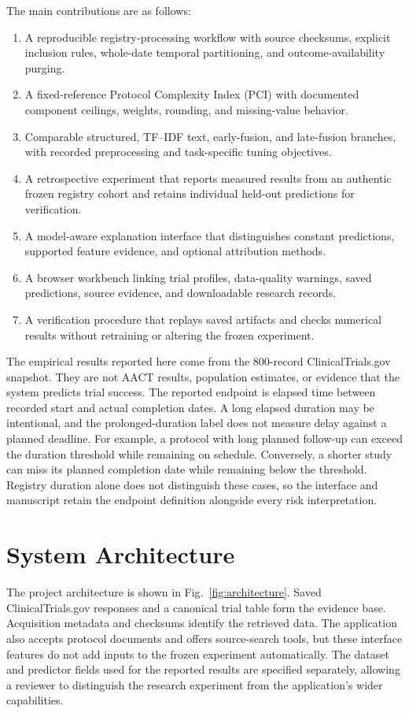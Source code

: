 \documentclass[10pt,letterpaper,twocolumn]{article}
\begin{document}
The main contributions are as follows:
\begin{enumerate}
\item A reproducible registry-processing workflow with source checksums, explicit inclusion rules, whole-date temporal partitioning, and outcome-availability purging.
\item A fixed-reference Protocol Complexity Index (PCI) with documented component ceilings, weights, rounding, and missing-value behavior.
\item Comparable structured, TF--IDF text, early-fusion, and late-fusion branches, with recorded preprocessing and task-specific tuning objectives.
\item A retrospective experiment that reports measured results from an authentic frozen registry cohort and retains individual held-out predictions for verification.
\item A model-aware explanation interface that distinguishes constant predictions, supported feature evidence, and optional attribution methods.
\item A browser workbench linking trial profiles, data-quality warnings, saved predictions, source evidence, and downloadable research records.
\item A verification procedure that replays saved artifacts and checks numerical results without retraining or altering the frozen experiment.
\end{enumerate}

The empirical results reported here come from the 800-record ClinicalTrials.gov snapshot. They are not AACT results, population estimates, or evidence that the system predicts trial success. The reported endpoint is elapsed time between recorded start and actual completion dates. A long elapsed duration may be intentional, and the prolonged-duration label does not measure delay against a planned deadline. For example, a protocol with long planned follow-up can exceed the duration threshold while remaining on schedule. Conversely, a shorter study can miss its planned completion date while remaining below the threshold. Registry duration alone does not distinguish these cases, so the interface and manuscript retain the endpoint definition alongside every risk interpretation.

\section{System Architecture}

The project architecture is shown in Fig.~\ref{fig:architecture}. Saved ClinicalTrials.gov responses and a canonical trial table form the evidence base. Acquisition metadata and checksums identify the retrieved data. The application also accepts protocol documents and offers source-search tools, but these interface features do not add inputs to the frozen experiment automatically. The dataset and predictor fields used for the reported results are specified separately, allowing a reviewer to distinguish the research experiment from the application's wider capabilities.
\end{document}
